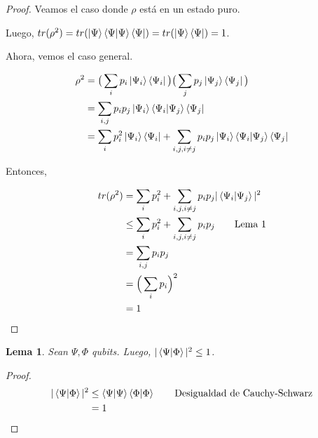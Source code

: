 \documentclass[a4paper,11pt]{article}
\newtheorem{lemma}[theorem2]{Lema}
\begin{document}
\begin{proof}
Veamos el caso donde $\rho$ está en un estado puro.

Luego, $tr(\rho^2) = tr(\left\vert{\Psi}\right\rangle\braket{\Psi | \Psi}\left\langle{\Psi}\right\vert) = tr(\left\vert{\Psi}\right\rangle\left\langle{\Psi}\right\vert) = 1$.

Ahora, vemos el caso general.

\begin{align*}
  \rho^2 
  &= \big( \sum_{i} p_i \left\vert{\Psi_i}\right\rangle\left\langle{\Psi_i}\right\vert \big) \big( \sum_{j} p_j \left\vert{\Psi_j}\right\rangle\left\langle{\Psi_j}\right\vert \big) 
  \\ &=\sum_{i, j} p_i p_j\left\vert{\Psi_i}\right\rangle\braket{\Psi_i | \Psi_j}\left\langle{\Psi_j}\right\vert
  \\ &= \sum_{i} p_i^2\left\vert{\Psi_i}\right\rangle\left\langle{\Psi_i}\right\vert + 
       \sum_{i, j, i \neq j} p_i p_j\left\vert{\Psi_i}\right\rangle\braket{\Psi_i | \Psi_j}\left\langle{\Psi_j}\right\vert
\end{align*}


Entonces, 

\begin{align*}
  tr(\rho^2) 
  &= \sum_{i} p_i^2 + 
    \sum_{i, j, i \neq j} p_i p_j|\braket{\Psi_i | \Psi_j}|^2
  \\ &\le \sum_{i} p_i^2 + 
       \sum_{i, j, i \neq j} p_i p_j               \tag*{Lema 1}
  \\ &= \sum_{i,j} p_ip_j 
  \\ &= \Big( \sum_{i}p_i \Big)^2 
  \\ &= 1 
\end{align*}

\end{proof}

\begin{lemma}
Sean $\Psi, \Phi$ qubits. Luego, $|\braket{\Psi | \Phi}|^2 \leq 1$.
\end{lemma}

\begin{proof}
\begin{align*}
  |\braket{\Psi | \Phi}|^2
  &\le \braket{\Psi | \Psi} \braket{\Phi | \Phi}   \tag*{Desigualdad de Cauchy-Schwarz}
  \\ &= 1
\end{align*}

\end{proof}
\end{document}
